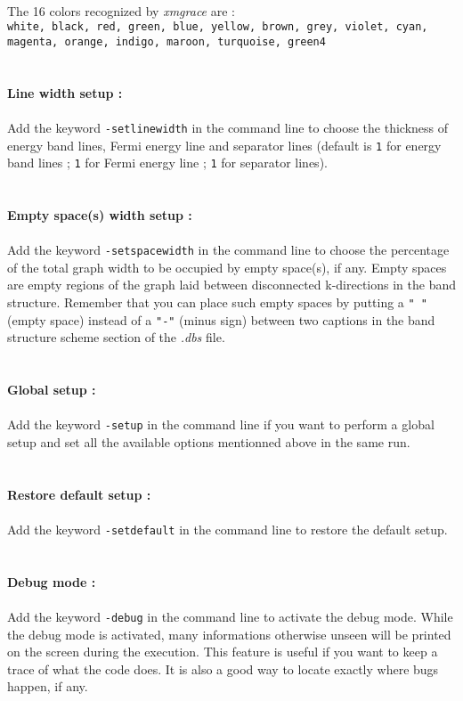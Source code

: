 \documentclass[prl]{article}
\begin{document}
\\
The 16 colors recognized by \textit{xmgrace} are : \\
\texttt{white, black, red, green, blue, yellow, brown, grey, violet, cyan, magenta, orange, indigo, maroon, turquoise, green4} \\
\\
\\
{\Large\textbf{Line width setup :}} \\
\\
Add the keyword \texttt{-setlinewidth} in the command line to choose the thickness of energy band lines, Fermi energy line and separator lines (default is \texttt{1} for energy band lines ;  \texttt{1} for Fermi energy line ; \texttt{1} for separator lines). \\
\\
\\
{\Large\textbf{Empty space(s) width setup :}} \\
\\
Add the keyword \texttt{-setspacewidth} in the command line to choose the percentage of the total graph width to be occupied by empty space(s), if any. Empty spaces are empty regions of the graph laid between disconnected k-directions in the band structure. Remember that you can place such empty spaces by putting a \texttt{" "} (empty space) instead of a \texttt{"-"} (minus sign) between two captions in the band structure scheme section of the \textit{.dbs} file. \\
\\
\\
{\Large\textbf{Global setup :}} \\
\\
Add the keyword \texttt{-setup} in the command line if you want to perform a global setup and set all the available options mentionned above in the same run. \\
\\
\\
{\Large\textbf{Restore default setup :}} \\
\\
Add the keyword \texttt{-setdefault} in the command line to restore the default setup.\\
\\
\\
{\Large\textbf{Debug mode :}} \\
\\
Add the keyword \texttt{-debug} in the command line to activate the debug mode. While the debug mode is activated, many informations otherwise unseen will be printed on the screen during the execution. This feature is useful if you want to keep a trace of what the code does. It is also a good way to locate exactly where bugs happen, if any.
\end{document}
